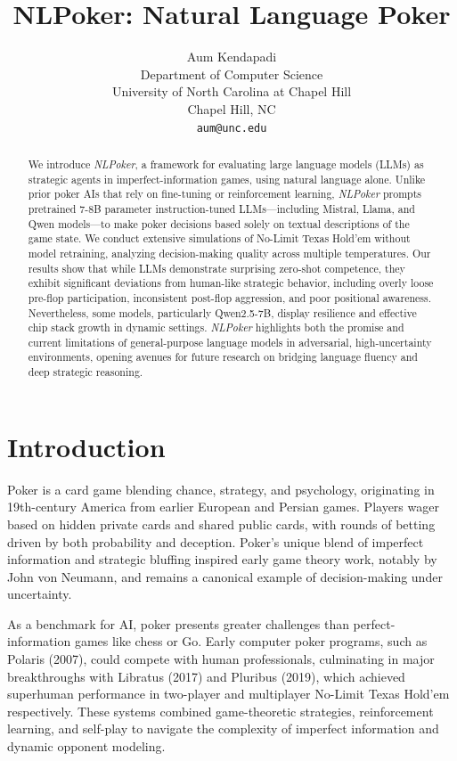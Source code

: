 \documentclass{article}
\title{NLPoker: Natural Language Poker}
\author{
  Aum Kendapadi \\
  Department of Computer Science\\
  University of North Carolina at Chapel Hill\\
  Chapel Hill, NC \\
  \texttt{aum@unc.edu} \\
}
\begin{document}
\maketitle
\begin{abstract}
    We introduce \emph{NLPoker}, a framework for evaluating large language models (LLMs) as strategic agents in imperfect-information games, using natural language alone. Unlike prior poker AIs that rely on fine-tuning or reinforcement learning, \emph{NLPoker} prompts pretrained 7-8B parameter instruction-tuned LLMs—including Mistral, Llama, and Qwen models—to make poker decisions based solely on textual descriptions of the game state. We conduct extensive simulations of No-Limit Texas Hold'em without model retraining, analyzing decision-making quality across multiple temperatures. Our results show that while LLMs demonstrate surprising zero-shot competence, they exhibit significant deviations from human-like strategic behavior, including overly loose pre-flop participation, inconsistent post-flop aggression, and poor positional awareness. Nevertheless, some models, particularly Qwen2.5-7B, display resilience and effective chip stack growth in dynamic settings. \emph{NLPoker} highlights both the promise and current limitations of general-purpose language models in adversarial, high-uncertainty environments, opening avenues for future research on bridging language fluency and deep strategic reasoning.
\end{abstract}
    

\section{Introduction}

Poker is a card game blending chance, strategy, and psychology, originating in 19th-century America from earlier European and Persian games. Players wager based on hidden private cards and shared public cards, with rounds of betting driven by both probability and deception. Poker’s unique blend of imperfect information and strategic bluffing inspired early game theory work, notably by John von Neumann, and remains a canonical example of decision-making under uncertainty.

As a benchmark for AI, poker presents greater challenges than perfect-information games like chess or Go. Early computer poker programs, such as Polaris (2007), could compete with human professionals, culminating in major breakthroughs with Libratus (2017) and Pluribus (2019), which achieved superhuman performance in two-player and multiplayer No-Limit Texas Hold’em respectively. These systems combined game-theoretic strategies, reinforcement learning, and self-play to navigate the complexity of imperfect information and dynamic opponent modeling.
\end{document}
